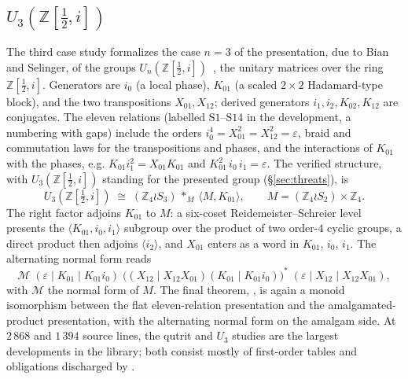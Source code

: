 \subsection{\texorpdfstring{$U_3(\mathbb{Z}[\tfrac12,i])$}{U3(Z[1/2,i])}}\label{sec:u3}

The third case study formalizes the case $n = 3$ of the presentation, due
to Bian and Selinger, of the groups
$U_n(\mathbb{Z}[\tfrac12,i])$~\cite{bian2021un}, the unitary matrices over
the ring $\mathbb{Z}[\tfrac12,i]$.
Generators are $i_0$ (a local phase), $K_{01}$ (a scaled $2{\times}2$
Hadamard-type block), and the two transpositions $X_{01}, X_{12}$;
derived generators $i_1, i_2, K_{02}, K_{12}$ are conjugates.  The eleven
relations (labelled $\mathrm{S1}$--$\mathrm{S14}$ in the development, a
numbering with gaps) include the orders $i_0^4 = X_{01}^2 = X_{12}^2 =
\varepsilon$, braid and commutation laws for the transpositions and
phases, and the interactions of $K_{01}$ with the
phases, e.g.
$K_{01} i_1^2 = X_{01} K_{01}$ and
$K_{01}^2\, i_0\, i_1 = \varepsilon$.  The verified structure, with
$U_3(\mathbb{Z}[\tfrac12,i])$ standing for the presented group
(\S\ref{sec:threats}), is
\[
  U_3(\mathbb{Z}[\tfrac12,i]) \;\cong\;
  (\mathbb{Z}_4 \wr S_3) \,\ast_{M}\, \langle M, K_{01} \rangle,
  \qquad M = (\mathbb{Z}_4 \wr S_2) \times \mathbb{Z}_4 .
\]
The right factor adjoins
$K_{01}$ to $M$: a six-coset Reidemeister--Schreier level presents
the $\langle K_{01}, i_0, i_1 \rangle$ subgroup over the product
of two order-$4$ cyclic groups, a direct product then adjoins
$\langle i_2 \rangle$, and $X_{01}$ enters as a word in $K_{01}$, $i_0$,
$i_1$.  The alternating normal form reads
\[
  \mathcal{M}\;(\varepsilon \mid K_{01} \mid K_{01} i_0)\;
  \bigl((X_{12} \mid X_{12}X_{01})(K_{01} \mid K_{01} i_0)\bigr)^{*}\;
  (\varepsilon \mid X_{12} \mid X_{12}X_{01}),
\]
with $\mathcal{M}$ the normal form of $M$.
The final theorem,
, is again a monoid isomorphism between
the flat eleven-relation presentation and the amalgamated-product
presentation, with the alternating normal form on the amalgam side.  At
$2\,868$ and $1\,394$ source lines, the qutrit and $U_3$ studies are the
largest developments in the library; both consist mostly of
first-order tables and obligations discharged by .
